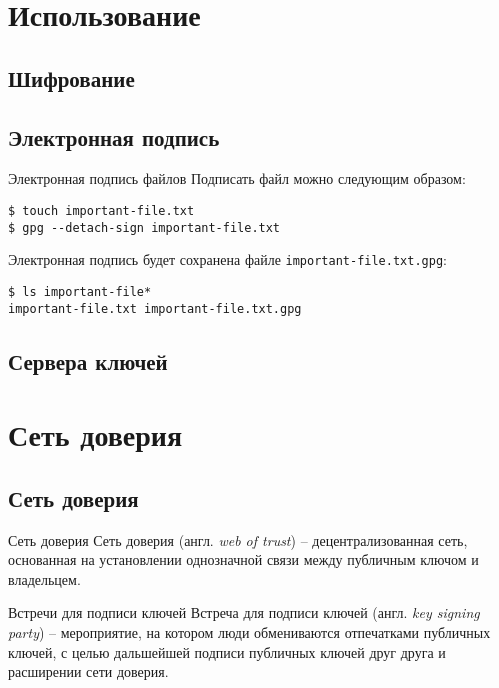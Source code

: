 \documentclass[presentation]{beamer}
\begin{document}


\section{Использование}

\subsection{Шифрование}


\subsection{Электронная подпись}

\begin{frame}[fragile]{Электронная подпись файлов}
  Подписать файл можно следующим образом:
\begin{verbatim}
$ touch important-file.txt
$ gpg --detach-sign important-file.txt
\end{verbatim}

  Электронная подпись будет сохранена файле
  \texttt{important-file.txt.gpg}:
\begin{verbatim}
$ ls important-file*
important-file.txt important-file.txt.gpg
\end{verbatim}
\end{frame}


\subsection{Сервера ключей}



\section{Сеть доверия}

\subsection{Сеть доверия}

\begin{frame}{Сеть доверия}
  \raisebox{-.30em}{\Large\HandRight}\hspace{.25em} Сеть доверия
  (англ. \emph{web of trust}) -- децентрализованная сеть, основанная
  на установлении однозначной связи между публичным ключом и
  владельцем.
\end{frame}

\begin{frame}{Встречи для подписи ключей}
  \raisebox{-.30em}{\Large\HandRight}\hspace{.25em} Встреча для
  подписи ключей (англ. \emph{key signing party}) -- мероприятие, на
  котором люди обмениваются отпечатками публичных ключей, с целью
  дальшейшей подписи публичных ключей друг друга и расширении сети
  доверия.
\end{frame}
\end{document}
